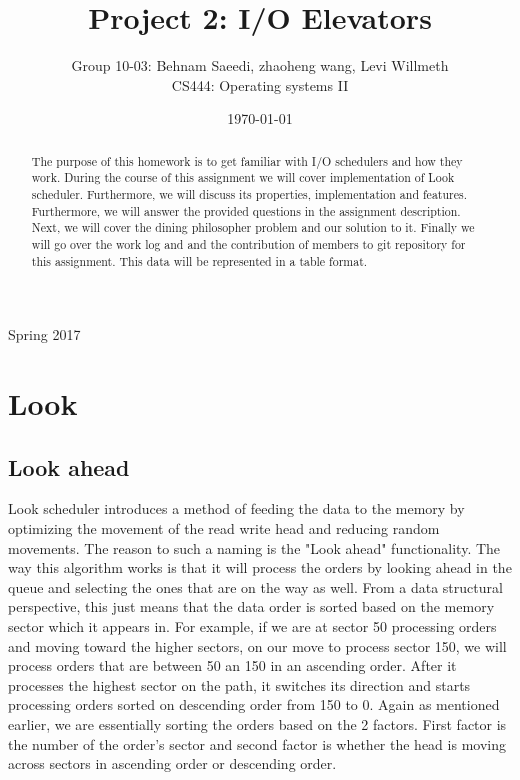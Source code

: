 \documentclass[journal,10pt,onecolumn,compsoc,letterpaper,draftclsnofoot,table,xcdraw]{IEEEtran} \usepackage[margin=0.75in]{geometry}
\title{Project 2: I/O Elevators}
\author{Group 10-03: Behnam Saeedi, zhaoheng wang, Levi Willmeth\\ CS444: Operating systems II}
\date{\today}
\begin{document}
\maketitle
\begin{centering}
Spring 2017
\begin{abstract}
\noindent The purpose of this homework is to get familiar with I/O schedulers and how they work. During the course of this assignment we will cover implementation of Look scheduler. Furthermore, we will discuss its properties, implementation and features. Furthermore, we will answer the provided questions in the assignment description. Next, we will cover the dining philosopher problem and our solution to it. Finally we will go over the work log and and the contribution of members to git repository for this assignment. This data will be represented in a table format.
\end{abstract}
\end{centering}
\newpage
\tableofcontents
\newpage 
\section{Look}
\subsection{Look ahead}
Look scheduler introduces a method of feeding the data to the memory by optimizing the movement of the read write head and reducing random movements. The reason to such a naming is the "Look ahead" functionality. The way this algorithm works is that it will process the orders by looking ahead in the queue and selecting the ones that are on the way as well. From a data structural perspective, this just means that the data order is sorted based on the memory sector which it appears in.  For example, if we are at sector 50 processing orders and moving toward the higher sectors, on our move to process sector 150, we will process orders that are between 50 an 150 in an ascending order. After it processes the highest sector on the path, it switches its direction and starts processing orders sorted on descending order from 150 to 0. Again as mentioned earlier, we are essentially sorting the orders based on the 2 factors. First factor is the number of the order's sector and second factor is whether the head is moving across sectors in ascending order or descending order.
\end{document}
